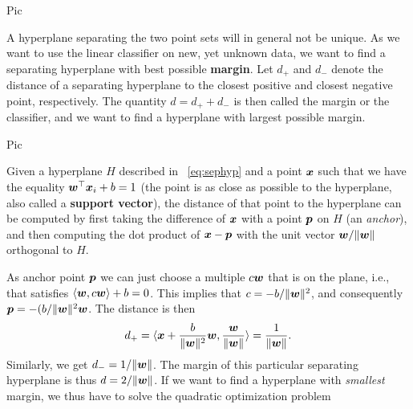 Pic

A hyperplane separating the two point sets will in general not be unique.
As we want to use the linear classifier on new, yet unknown data, we want to find a separating hyperplane with best possible \textbf{margin}. Let $d_+$ and $d_-$ denote the distance of a separating hyperplane to the closest positive and closest negative point, respectively. The quantity $d=d_++d_-$ is then called the margin or the classifier, and we want to find a hyperplane with largest possible margin.

Pic

Given a hyperplane $H$ described in ~\eqref{eq:sephyp} and a point $\bm{x}$ such that we have the equality $\bm{w}^{\top}\bm{x}_i+b=1$ (the point is as close as possible to the hyperplane, also called a \textbf{support vector}), the distance of that point to the hyperplane can be computed by first taking the difference of $\bm{x}$ with a point $\bm{p}$ on $H$ (an {\em anchor}), and then computing the dot product of $\bm{x}-\bm{p}$ with the unit vector $\bm{w}/\Vert {\bm{w}}\Vert$ orthogonal to $H$.


As anchor point $\bm{p}$ we can just choose a multiple $c\bm{w}$ that is on the plane, i.e., that satisfies $\langle {\bm{w}}, {c\bm{w}} \rangle+b=0$. This implies that $c=-b/\Vert {\bm{w}}\Vert^2$, and consequently $\bm{p} = -(b/\Vert {\bm{w}}\Vert^2 \bm{w}$. The distance is then
\begin{equation*}
  d_+ = \langle {\bm{x}+\frac{b}{\Vert {\bm{w}}\Vert^2}\bm{w}}, {\frac{\bm{w}}{\Vert {\bm{w}}\Vert}} \rangle = \frac{1}{\Vert {\bm{w}}\Vert}.
\end{equation*}
Similarly, we get $d_-=1/\Vert {\bm{w}}\Vert$. The margin of this particular separating hyperplane is thus $d=2/\Vert {\bm{w}}\Vert$. If we want to find a hyperplane with {\em smallest} margin, we thus have to solve the quadratic optimization problem

